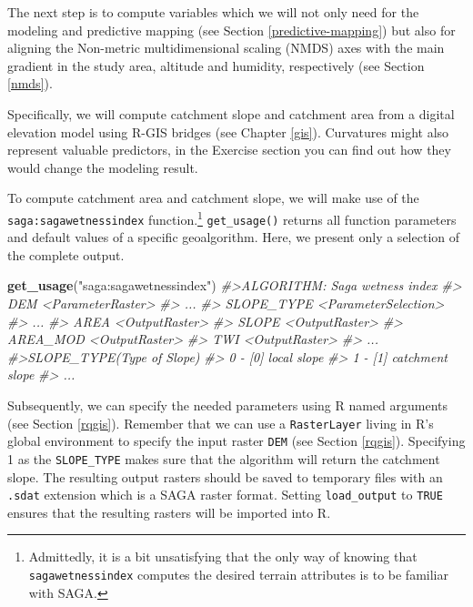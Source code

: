 \documentclass[]{krantz}
\newenvironment{Shaded}{\begin{snugshade}}{\end{snugshade}}
\newcommand{\CommentTok}[1]{\textcolor[rgb]{0.37,0.37,0.37}{\textit{#1}}}
\newcommand{\KeywordTok}[1]{\textcolor[rgb]{0.27,0.27,0.27}{\textbf{#1}}}
\newcommand{\NormalTok}[1]{#1}
\newcommand{\StringTok}[1]{\textcolor[rgb]{0.5,0.5,0.5}{#1}}
\let\rmarkdownfootnote\footnote%
\def\footnote{\protect\rmarkdownfootnote}
\begin{document}
The next step is to compute variables which we will not only need for the modeling and predictive mapping (see Section \ref{predictive-mapping}) but also for aligning the Non-metric multidimensional scaling (NMDS) axes with the main gradient in the study area, altitude and humidity, respectively (see Section \ref{nmds}).

Specifically, we will compute catchment slope and catchment area from a digital elevation model using R-GIS bridges (see Chapter \ref{gis}).
Curvatures might also represent valuable predictors, in the Exercise section you can find out how they would change the modeling result.

To compute catchment area and catchment slope, we will make use of the \texttt{saga:sagawetnessindex} function.\footnote{Admittedly, it is a bit unsatisfying that the only way of knowing that \texttt{sagawetnessindex} computes the desired terrain attributes is to be familiar with SAGA.}
\texttt{get\_usage()} returns all function parameters and default values of a specific geoalgorithm.
Here, we present only a selection of the complete output.

\begin{Shaded}
\begin{Highlighting}[]
\KeywordTok{get_usage}\NormalTok{(}\StringTok{"saga:sagawetnessindex"}\NormalTok{)}
\CommentTok{#>ALGORITHM: Saga wetness index}
\CommentTok{#>  DEM <ParameterRaster>}
\CommentTok{#>  ...}
\CommentTok{#>  SLOPE_TYPE <ParameterSelection>}
\CommentTok{#>  ...}
\CommentTok{#>  AREA <OutputRaster>}
\CommentTok{#>  SLOPE <OutputRaster>}
\CommentTok{#>  AREA_MOD <OutputRaster>}
\CommentTok{#>  TWI <OutputRaster>}
\CommentTok{#> ...}
\CommentTok{#>SLOPE_TYPE(Type of Slope)}
\CommentTok{#>  0 - [0] local slope}
\CommentTok{#>  1 - [1] catchment slope}
\CommentTok{#> ...}
\end{Highlighting}
\end{Shaded}

Subsequently, we can specify the needed parameters using R named arguments (see Section \ref{rqgis}).
Remember that we can use a \texttt{RasterLayer} living in R's global environment to specify the input raster \texttt{DEM} (see Section \ref{rqgis}).
Specifying 1 as the \texttt{SLOPE\_TYPE} makes sure that the algorithm will return the catchment slope.
The resulting output rasters should be saved to temporary files with an \texttt{.sdat} extension which is a SAGA raster format.
Setting \texttt{load\_output} to \texttt{TRUE} ensures that the resulting rasters will be imported into R.
\end{document}
